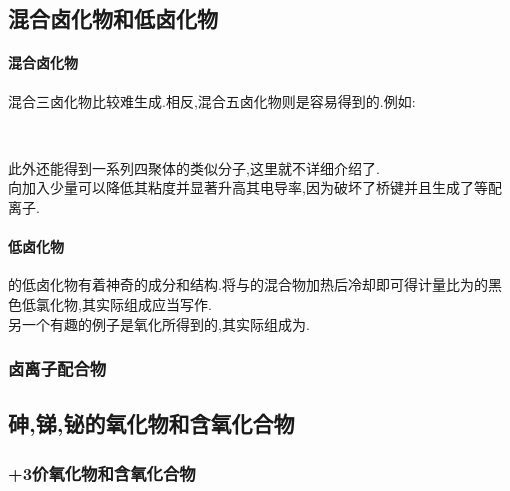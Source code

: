 \documentclass{ctexart}
\begin{document}
\subsection{混合卤化物和低卤化物}
\paragraph{混合卤化物}
混合三卤化物比较难生成.相反,混合五卤化物则是容易得到的.例如:
\begin{center}
    \\
\end{center}
此外还能得到一系列四聚体的类似分子,这里就不详细介绍了.\\
\indent 向加入少量可以降低其粘度并显著升高其电导率,因为破坏了桥键并且生成了\ce{[SbF5Cl]-}等配离子.
\paragraph{低卤化物}
的低卤化物有着神奇的成分和结构.将与的混合物加热后冷却即可得计量比为的黑色低氯化物,其实际组成应当写作.\\
\indent 另一个有趣的例子是氧化所得到的,其实际组成为.
\subsubsection{卤离子配合物}
\subsection{砷,锑,铋的氧化物和含氧化合物}
\subsubsection{+3价氧化物和含氧化合物}
\end{document}
